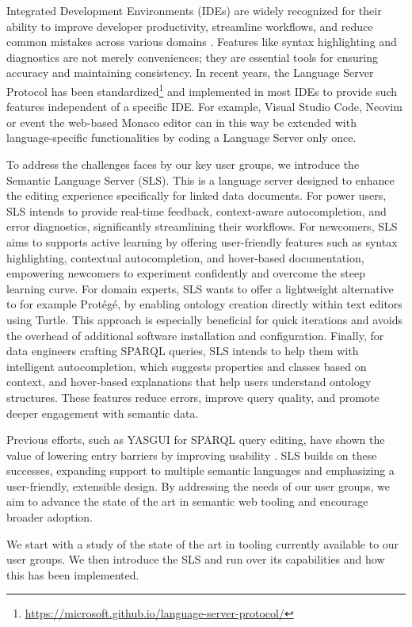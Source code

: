 Integrated Development Environments (IDEs) are widely recognized for their ability to improve developer productivity, streamline workflows, and reduce common mistakes across various domains \cite{javaEngineer}. 
Features like syntax highlighting and diagnostics are not merely conveniences; they are essential tools for ensuring accuracy and maintaining consistency. 
In recent years, the Language Server Protocol has been standardized\footnote{\url{https://microsoft.github.io/language-server-protocol/}} and implemented in most IDEs to provide such features independent of a specific IDE.
For example, Visual Studio Code, Neovim or event the web-based Monaco editor can in this way be extended with language-specific functionalities by coding a Language Server only once.

To address the challenges faces by our key user groups, we introduce the Semantic Language Server (SLS).
This is a language server designed to enhance the editing experience specifically for linked data documents. 
For power users, SLS intends to provide real-time feedback, context-aware autocompletion, and error diagnostics, significantly streamlining their workflows.
For newcomers, SLS aims to supports active learning by offering user-friendly features such as syntax highlighting, contextual autocompletion, and hover-based documentation, empowering newcomers to experiment confidently and overcome the steep learning curve.
For domain experts, SLS wants to offer a lightweight alternative to for example Protégé, by enabling ontology creation directly within text editors using Turtle.
This approach is especially beneficial for quick iterations and avoids the overhead of additional software installation and configuration.
Finally, for data engineers crafting SPARQL queries, SLS intends to help them with intelligent autocompletion, which suggests properties and classes based on context, and hover-based explanations that help users understand ontology structures.
These features reduce errors, improve query quality, and promote deeper engagement with semantic data.


Previous efforts, such as YASGUI for SPARQL query editing, have shown the value of lowering entry barriers by improving usability \cite{10.3233/SW-150197,10.1007/978-3-642-41242-4_7}. 
SLS builds on these successes, expanding support to multiple semantic languages and emphasizing a user-friendly, extensible design. 
By addressing the needs of our user groups, we aim to advance the state of the art in semantic web tooling and encourage broader adoption.

We start with a study of the state of the art in tooling currently available to our user groups.
We then introduce the SLS and run over its capabilities and how this has been implemented.
